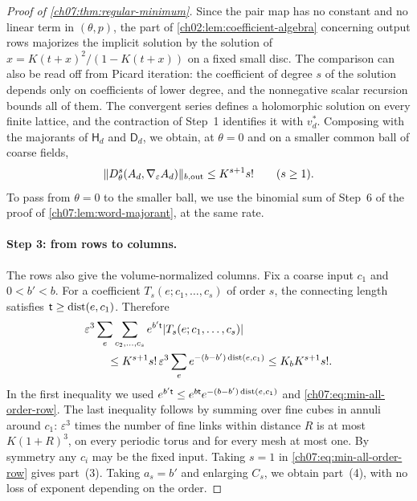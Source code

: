 \begin{proof}[Proof of \cref{ch07:thm:regular-minimum}]
Since the pair map has no constant and no linear term in $(\theta,p)$, the part of \cref{ch02:lem:coefficient-algebra} concerning output rows majorizes the implicit solution by the solution of $x=K(t+x)^2/(1-K(t+x))$ on a fixed small disc. The comparison can also be read off from Picard iteration: the coefficient of degree $s$ of the solution depends only on coefficients of lower degree, and the nonnegative scalar recursion bounds all of them. The convergent series defines a holomorphic solution on every finite lattice, and the contraction of Step~1 identifies it with $v_d^*$. Composing with the majorants of $\mathsf H_d$ and $\mathsf D_d$, we obtain, at $\theta=0$ and on a smaller common ball of coarse fields,
\begin{equation}\label{ch07:eq:min-all-order-row}
 \lVert D_\theta^s(A_d,\nabla_\varepsilon A_d)\rVert_{b,\mathrm{out}}\le K^{s+1}s!\qquad(s\ge1).
\end{equation}
To pass from $\theta=0$ to the smaller ball, we use the binomial sum of Step~6 of the proof of \cref{ch07:lem:word-majorant}, at the same rate.

\paragraph{Step 3: from rows to columns.}
The rows also give the volume-normalized columns. Fix a coarse input $c_1$ and $0<b'<b$. For a coefficient $T_s(e;c_1,\dots,c_s)$ of order $s$, the connecting length satisfies $\mathsf t\ge\operatorname{dist}(e,c_1)$. Therefore
\begin{equation}\label{ch07:eq:row-to-physical-column}
 \begin{aligned}
 &\varepsilon^3\sum_e\sum_{c_2,\dots,c_s}e^{b'\mathsf t}\lvert T_s(e;c_1,\dots,c_s)\rvert\\
 &\qquad\le K^{s+1}s!\,\varepsilon^3\sum_ee^{-(b-b')\operatorname{dist}(e,c_1)}\le K_bK^{s+1}s! .
 \end{aligned}
\end{equation}
In the first inequality we used $e^{b'\mathsf t}\le e^{b\mathsf t}e^{-(b-b')\operatorname{dist}(e,c_1)}$ and \eqref{ch07:eq:min-all-order-row}. The last inequality follows by summing over fine cubes in annuli around $c_1$: $\varepsilon^3$ times the number of fine links within distance $R$ is at most $K(1+R)^3$, on every periodic torus and for every mesh at most one. By symmetry any $c_i$ may be the fixed input. Taking $s=1$ in \eqref{ch07:eq:min-all-order-row} gives part~(3). Taking $a_s=b'$ and enlarging $C_s$, we obtain part~(4), with no loss of exponent depending on the order.


\end{proof}
